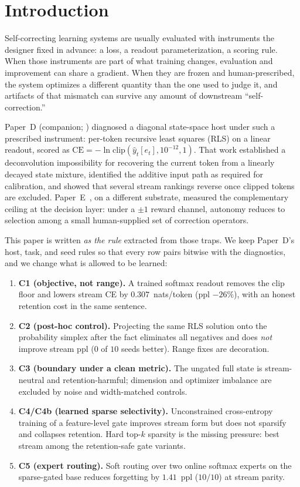 \documentclass[preprint,12pt]{elsarticle}
\begin{document}
\section{Introduction}
\label{sec:intro}

Self-correcting learning systems are usually evaluated with
instruments the designer fixed in advance: a loss, a readout
parameterization, a scoring rule. When those instruments are part of
what training changes, evaluation and improvement can share a
gradient. When they are frozen and human-prescribed, the system
optimizes a different quantity than the one used to judge it, and
artifacts of that mismatch can survive any amount of downstream
``self-correction.''

Paper~D (companion; \cite{dpaper}) diagnosed a diagonal state-space host under such a
prescribed instrument: per-token recursive least squares (RLS) on a
linear readout, scored as
$\mathrm{CE}=-\ln\mathrm{clip}(\hat y_t[e_t],10^{-12},1)$.
That work established a deconvolution impossibility for recovering the
current token from a linearly decayed state mixture, identified the
additive input path as required for calibration, and showed that
several stream rankings reverse once clipped tokens are excluded.
Paper~E~\cite{epaper}, on a different substrate, measured the complementary
ceiling at the decision layer: under a $\pm1$ reward channel,
autonomy reduces to selection among a small human-supplied set of
correction operators.

This paper is written \emph{as the rule} extracted from those traps.
We keep Paper~D's host, task, and seed rules so that every row pairs
bitwise with the diagnostics, and we change what is allowed to be
learned:

\begin{enumerate}
\item \textbf{C1 (objective, not range).} A trained softmax readout
removes the clip floor and lowers stream CE by $0.307$~nats/token
(ppl $-26\%$), with an honest retention cost in the same sentence.
\item \textbf{C2 (post-hoc control).} Projecting the same RLS solution
onto the probability simplex after the fact eliminates all negatives
and does \emph{not} improve stream ppl ($0$ of $10$ seeds better). Range fixes are
decoration.
\item \textbf{C3 (boundary under a clean metric).} The ungated full
state is stream-neutral and retention-harmful; dimension and optimizer
imbalance are excluded by noise and width-matched controls.
\item \textbf{C4/C4b (learned sparse selectivity).} Unconstrained
cross-entropy training of a feature-level gate improves stream form
but does not sparsify and collapses retention. Hard top-$k$ sparsity
is the missing pressure: best stream among the retention-safe gate
variants.
\item \textbf{C5 (expert routing).} Soft routing over two online
softmax experts on the sparse-gated base reduces forgetting by
$1.41$~ppl ($10/10$) at stream parity.
\end{enumerate}
\end{document}
